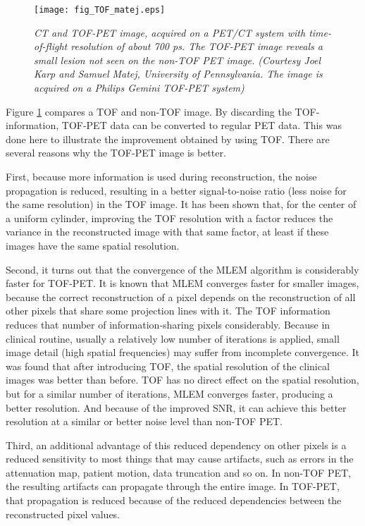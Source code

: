 \begin{figure}[tb]
\centering
\texttt{[image: fig\_TOF\_matej.eps]}
\caption{\label{fig:TOFmatej} \emph{CT and TOF-PET image, acquired on
    a PET/CT system with time-of-flight resolution of about 700
    ps. The TOF-PET image reveals a small lesion not seen on the
    non-TOF PET image. (Courtesy Joel Karp and Samuel Matej,
    University of Pennsylvania. The image is acquired on a Philips
    Gemini TOF-PET system)}}
\end{figure}

Figure \ref{fig:TOFmatej} compares a TOF and non-TOF image. By
discarding the TOF-information, TOF-PET data can be converted to
regular PET data. This was done here to illustrate the improvement
obtained by using TOF. There are several reasons why the TOF-PET image
is better.

First, because more information is used during reconstruction, the
noise propagation is reduced, resulting in a better signal-to-noise
ratio (less noise for the same resolution) in the TOF image. It has
been shown that, for the center of a uniform cylinder, improving the
TOF resolution with a factor reduces the variance in the reconstructed
image with that same factor, at least if these images have the same
spatial resolution.

Second, it turns out that the convergence of the MLEM algorithm is
considerably faster for TOF-PET. It is known that MLEM converges
faster for smaller images, because the correct reconstruction of a
pixel depends on the reconstruction of all other pixels that share
some projection lines with it. The TOF information reduces that number
of information-sharing pixels considerably. Because in clinical
routine, usually a relatively low number of iterations is applied,
small image detail (high spatial frequencies) may suffer from
incomplete convergence. It was found that after introducing TOF, the
spatial resolution of the clinical images was better than before. TOF
has no direct effect on the spatial resolution, but for a similar
number of iterations, MLEM converges faster, producing a better
resolution. And because of the improved SNR, it can achieve this
better resolution at a similar or better noise level than non-TOF
PET. 

Third, an additional advantage of this reduced dependency on other
pixels is a reduced sensitivity to most things that may cause
artifacts, such as errors in the attenuation map, patient motion, data
truncation and so on. In non-TOF PET, the resulting artifacts can
propagate through the entire image. In TOF-PET, that propagation is
reduced because of the reduced dependencies between the reconstructed
pixel values.

